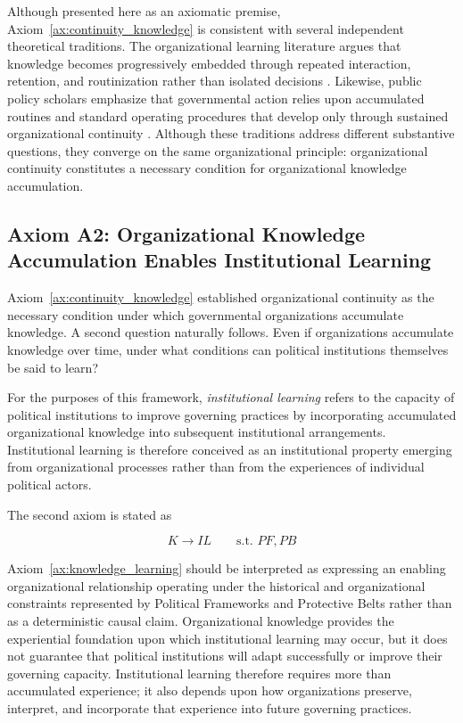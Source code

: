 \documentclass[doc, 12pt, a4paper,floatsintext]{apa7}
\begin{document}
Although presented here as an axiomatic premise, Axiom~\ref{ax:continuity_knowledge} is consistent with several independent theoretical traditions. The organizational learning literature argues that knowledge becomes progressively embedded through repeated interaction, retention, and routinization rather than isolated decisions \parencite{nonaka_knowledge-creating_1998,levitt_organizational_1988}. Likewise, public policy scholars emphasize that governmental action relies upon accumulated routines and standard operating procedures that develop only through sustained organizational continuity \parencite{allison_conceptual_1969,foss_simon_2005,lindblom_science_1959}. Although these traditions address different substantive questions, they converge on the same organizational principle: organizational continuity constitutes a necessary condition for organizational knowledge accumulation.
%
%
\subsection{Axiom A2: Organizational Knowledge Accumulation Enables Institutional Learning}

Axiom~\ref{ax:continuity_knowledge} established organizational continuity as the necessary condition under which governmental organizations accumulate knowledge. A second question naturally follows. Even if organizations accumulate knowledge over time, under what conditions can political institutions themselves be said to learn?

For the purposes of this framework, \emph{institutional learning} refers to the capacity of political institutions to improve governing practices by incorporating accumulated organizational knowledge into subsequent institutional arrangements. Institutional learning is therefore conceived as an institutional property emerging from organizational processes rather than from the experiences of individual political actors.

The second axiom is stated as

\begin{equation}
\tag{A2}
K \rightarrow IL
\qquad
\text{s.t. }PF,PB
\label{ax:knowledge_learning}
\end{equation}

Axiom~\ref{ax:knowledge_learning} should be interpreted as expressing an enabling organizational relationship operating under the historical and organizational constraints represented by Political Frameworks and Protective Belts rather than as a deterministic causal claim. Organizational knowledge provides the experiential foundation upon which institutional learning may occur, but it does not guarantee that political institutions will adapt successfully or improve their governing capacity. Institutional learning therefore requires more than accumulated experience; it also depends upon how organizations preserve, interpret, and incorporate that experience into future governing practices.
\end{document}
